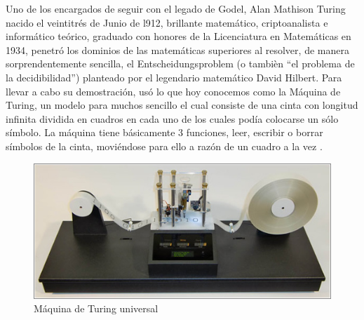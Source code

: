 \documentclass{article}
\begin{document}
Uno de los encargados de seguir con el legado de Godel, Alan Mathison Turing nacido el veintitrés de Junio de l912, brillante matemático, criptoanalista e informático teórico, graduado con honores de la Licenciatura en Matemáticas en 1934, penetró los dominios de las matemáticas superiores al resolver, de manera sorprendentemente sencilla, el Entscheidungsproblem (o tambièn “el problema de la decidibilidad”) planteado por el legendario matemático  David Hilbert. 
Para llevar a cabo su demostración, usó lo que hoy conocemos como la Máquina de Turing, un modelo para muchos  sencillo el cual consiste de una cinta con longitud infinita dividida en cuadros en cada uno de los cuales podía colocarse un sólo símbolo. La máquina tiene básicamente 3 funciones, leer, escribir o borrar símbolos de la cinta, moviéndose para ello a razón de un cuadro a la vez .                                                                                                                                                                                                                                                                                                   \begin{figure}[h!]
\centering
\includegraphics[scale=0.6]{turingFull560.jpg}
\caption{Máquina de Turing universal}
\label{fig:universe}
\end{figure}           










\end{document}
